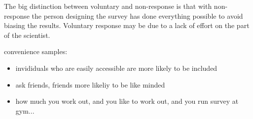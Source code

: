 \documentclass[11pt,containsverbatim,handout,xcolor=xelatex,dvipsnames,table]{beamer}
\begin{document}
\begin{frame}
{\begin{itemize}
\end{itemize}

The big distinction between voluntary and non-response is that with non-response the person designing the survey has done everything possible to avoid biasing the results.  Voluntary response may be due to a lack of effort on the part of the scientist.

convenience samples:
\begin{itemize}

\item invididuals who are easily accessible are more likely to be included

\item ask friends, friends more likeliy to be like minded

\item how much you work out, and you like to work out, and you run survey at gym...

\end{itemize}

}

\end{frame}

\end{document}
